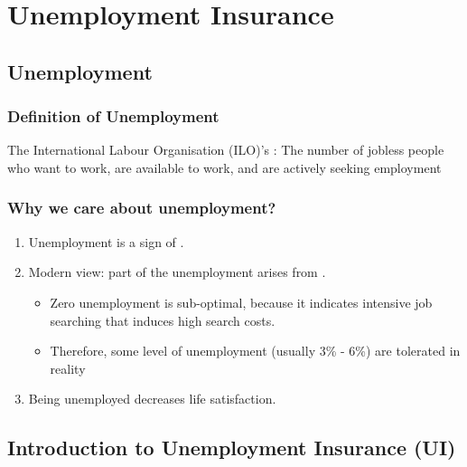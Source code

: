 \chapter{Unemployment Insurance}


\section{Unemployment}

    \subsection{Definition of Unemployment}
        The International Labour Organisation (ILO)'s : The number of jobless people who want to work, are available to work, and are actively seeking employment
        
    \subsection{Why we care about unemployment?}
        \begin{enumerate}
            \item Unemployment is a sign of .
            \item Modern view: part of the unemployment arises from .
                \begin{itemize}
                    \item Zero unemployment is sub-optimal, because it indicates intensive job searching that induces high search costs.
                    \item Therefore, some level of unemployment (usually 3\% - 6\%) are tolerated in reality
                \end{itemize}
            \item Being unemployed decreases life satisfaction.
        \end{enumerate}

\section{Introduction to Unemployment Insurance (UI)}

